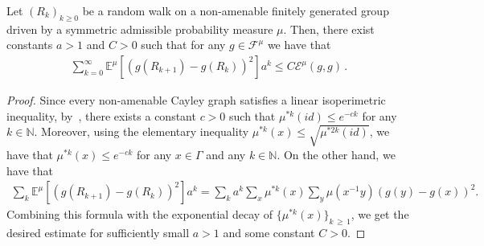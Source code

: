 \documentclass[AHL,Unicode,longabstracts,published]{cedram}
\newcommand{\ce}{\mathcal{E}}
\newcommand{\cf}{\mathcal{F}}
\newcommand{\bn}{\mathbb{N}}
\newcommand{\be}{\mathbb{E}}
\begin{document}
\begin{lemm}\label{ac}
Let $(R_k)_{k\geq0}$ be a random walk on a non-amenable finitely generated group driven by a symmetric admissible probability measure $\mu$. Then, there exist constants $a>1$ and $C>0$ such that for any $g\in\cf^{\mu}$ we have that
\begin{align}\label{pi; mu}
\sum_{k=0}^{\infty}\be^{\mu}\left[\left(g(R_{k+1})-g(R_k)\right)^2\right]a^k\leq C\ce^\mu(g,g)\,.
\end{align}
\end{lemm}

\begin{proof}
Since every non-amenable Cayley graph satisfies a linear isoperimetric inequality, by~\cite[Theorem~10.3]{Woe}, there exists a constant $c>0$ such that $\mu^{*k}(id)\leq e^{-ck}$ for any $k\in\bn$. Moreover, using the elementary inequality $\mu^{*k}(x)\leq\sqrt{\mu^{*2k}(id)}$, we have that $\mu^{*k}(x)\leq e^{-ck}$ for any $x\in\Gamma$ and any $k\in\bn$. On the other hand, we have that
\begin{align*}
\sum_{k}\be^{\mu}\left[\left(g(R_{k+1})-g(R_k)\right)^2\right]a^k=\sum_ka^k\sum_x\mu^{*k}(x)\sum_{y}\mu\left(x^{-1}y\right)(g(y)-g(x))^2.
\end{align*}
Combining this formula with the exponential decay of $\{\mu^{*k}(x)\}_{k\,\geq\,1}$, we get the desired estimate for sufficiently small $a>1$ and some constant $C>0$.
\end{proof}
\end{document}
